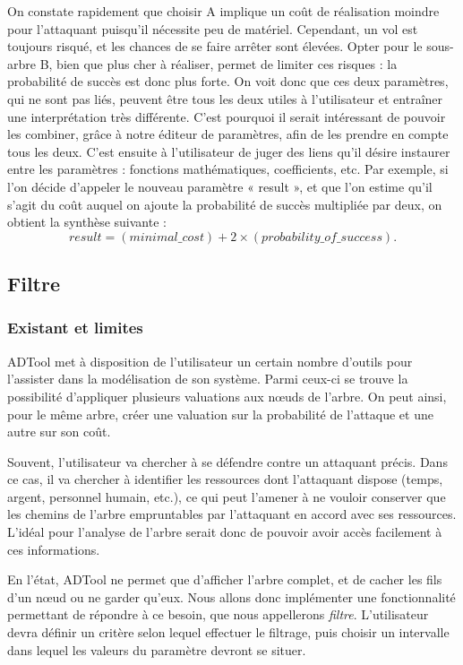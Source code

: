 			On constate rapidement que choisir A implique un coût de réalisation moindre pour l'attaquant puisqu'il nécessite peu de matériel. Cependant, un vol est toujours risqué, et les chances de se faire arrêter sont élevées. Opter pour le sous-arbre B, bien que plus cher à réaliser, permet de limiter ces risques : la probabilité de succès est donc plus forte. On voit donc que ces deux paramètres, qui ne sont pas liés, peuvent être tous les deux utiles à l'utilisateur et entraîner une interprétation très différente. C'est pourquoi il serait intéressant de pouvoir les combiner, grâce à notre éditeur de paramètres, afin de les prendre en compte tous les deux. C'est ensuite à l'utilisateur de juger des liens qu'il désire instaurer entre les paramètres : fonctions mathématiques, coefficients, etc. Par exemple, si l'on décide d'appeler le nouveau paramètre « result », et que l'on estime qu'il s'agit du coût auquel on ajoute la probabilité de succès multipliée par deux, on obtient la synthèse suivante : \[ result = (minimal\_cost) + 2 \times (probability\_of\_success).\]


	\subsection{Filtre}
		\subsubsection{Existant et limites}
			ADTool met à disposition de l'utilisateur un certain nombre d'outils pour l'assister dans la modélisation de son système. Parmi ceux-ci se trouve la possibilité d'appliquer plusieurs valuations aux nœuds de l'arbre. On peut ainsi, pour le même arbre, créer une valuation sur la probabilité de l'attaque et une autre sur son coût.

			Souvent, l'utilisateur va chercher à se défendre contre un attaquant précis. Dans ce cas, il va chercher à identifier les ressources dont l'attaquant dispose (temps, argent, personnel humain, etc.), ce qui peut l'amener à ne vouloir conserver que les chemins de l'arbre empruntables par l'attaquant en accord avec ses ressources. L'idéal pour l'analyse de l'arbre serait donc de pouvoir avoir accès facilement à ces informations.

			En l'état, ADTool ne permet que d'afficher l'arbre complet, et de cacher les fils d'un nœud ou ne garder qu'eux. Nous allons donc implémenter une fonctionnalité permettant de répondre à ce besoin, que nous appellerons \textit{filtre}. L’utilisateur devra définir un critère selon lequel effectuer le filtrage, puis choisir un intervalle dans lequel les valeurs du paramètre devront se situer.

